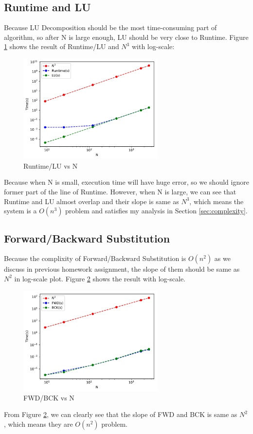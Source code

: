 \documentclass{article}
\begin{document}
\subsection{Runtime and LU}
Because LU Decomposition should be the most time-consuming part of algorithm, so after N is large enough, LU should be very close to
Runtime. Figure \ref{fig:runtime_lu} shows the result of Runtime/LU and $N^3$ with log-scale:
\begin{figure}[H]
    \centering
    \includegraphics[width=0.65\textwidth]{src/runtime_lu.pdf}
    \caption{Runtime/LU vs N}
    \label{fig:runtime_lu}
\end{figure}
Because when N is small, execution time will have huge error, so we should ignore former part of the line of Runtime. However, when
N is large, we can see that Runtime and LU almost overlap and their slope is same as $N^3$, which means the system is a 
{\boldmath$O(n^3)$} problem and satisfies my analysis in Section \ref{sec:complexity}.

\subsection{Forward/Backward Substitution}
Because the complixity of Forward/Backward Substitution is {\boldmath$O(n^2)$} as we discuss in previous homework assignment, the
slope of them should be same as $N^2$ in log-scale plot. Figure \ref{fig:fwd_bck} shows the result with log-scale.
\begin{figure}[H]
    \centering
    \includegraphics[width=0.65\textwidth]{src/fwd_bck.pdf}
    \caption{FWD/BCK vs N}
    \label{fig:fwd_bck}
\end{figure}
From Figure \ref{fig:fwd_bck}, we can clearly see that the slope of FWD and BCK is same as $N^2$, which means they are
{\boldmath$O(n^2)$} problem.
\end{document}
